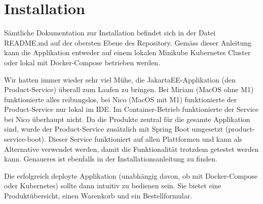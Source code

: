 
\section{Installation}
\label{sec:installation}

Sämtliche Dokumentation zur Installation befindet sich in der Datei README.md auf der obersten Ebene des Repository. Gemäss dieser Anleitung kann die Applikation entweder auf einem
lokalen Minikube Kubernetes Cluster oder lokal mit Docker-Compose betrieben werden. 

Wir hatten immer wieder sehr viel Mühe, die JakartaEE-Applikation (den Product-Service) überall zum Laufen zu bringen. Bei Miriam (MacOS ohne M1) funktionierte alles reibungslos,
bei Nico (MacOS mit M1) funktionierte der Product-Service nur lokal im IDE. Im Container-Betrieb funktionierte der Service bei Nico überhaupt nicht. Da die Produkte zentral für die gesamte
Applikation sind, wurde der Product-Service zusätzlich mit Spring Boot umgesetzt (product-service-boot). Dieser Service funktioniert auf allen Plattformen und kann als Alternative
verwendet werden, damit die Funktionalität trotzdem getestet werden kann. Genaueres ist ebenfalls in der Installationsanleitung zu finden.

Die erfolgreich deployte Applikation (unabhängig davon, ob mit Docker-Compose oder Kubernetes) sollte dann intuitiv zu bedienen sein. Sie bietet eine Produktübersicht, einen Warenkorb
und ein Bestellformular.